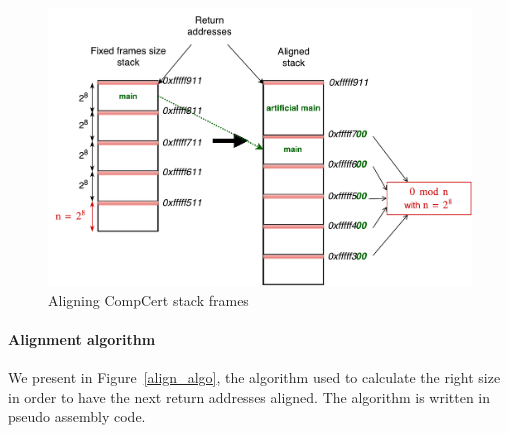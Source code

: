 \documentclass[11pt]{sdm}
\begin{document}
\begin{figure}[!ht]
\centering
\includegraphics[scale=0.6]{images/stack_align.pdf}
\caption{Aligning CompCert stack frames}
\label{stack_align}
\end{figure}

\paragraph{Alignment algorithm}
\label{par:Alignment algorithm}
We present in Figure~\ref{align_algo}, the algorithm used to calculate the right size in order to have the next return addresses aligned. The algorithm is written in pseudo assembly code.
\end{document}
